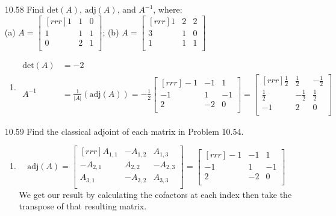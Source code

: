 \documentclass[12pt]{article}
\theoremstyle{definition}
\theoremstyle{plain}
\begin{document}
\begin{enumerate}
\item[10.58]Find $\mathrm{det}(A)$, $\mathrm{adj}(A)$, and $A^{-1}$, where:\\
(a) $A=\begin{bmatrix}[rrr]1&1&0\\1&1&1\\0&2&1\\\end{bmatrix}$; (b) $A=\begin{bmatrix}[rrr]1&2&2\\3&1&0\\1&1&1\\\end{bmatrix}$
	\begin{enumerate}
	\item
	\begin{align*}
	\mathrm{det}(A)&= -2\\
	A^{-1}&=\frac{1}{|A|}(\mathrm{adj}(A))=-\frac{1}{2}\begin{bmatrix}[rrr]-1&-1&1\\-1&1&-1\\2&-2&0\\\end{bmatrix} = \begin{bmatrix}[rrr]\frac{1}{2}&\frac{1}{2}&-\frac{1}{2}\\\frac{1}{2}&-\frac{1}{2}&\frac{1}{2}\\-1&2&0\\\end{bmatrix}
	\end{align*}
	\end{enumerate}		
	
\item[10.59]Find the classical adjoint of each matrix in Problem 10.54.
	\begin{enumerate}
	\item
	\[ \mathrm{adj}(A)= \begin{bmatrix}[rrr]A_{1,1}&-A_{1,2}&A_{1,3}\\-A_{2,1}&A_{2,2}&-A_{2,3}\\A_{3,1}&-A_{3,2}&A_{3,3}\\\end{bmatrix} = \begin{bmatrix}[rrr]-1&-1&1\\-1&1&-1\\2&-2&0\\\end{bmatrix} \]
	We get our result by calculating the cofactors at each index then take the transpose of that resulting matrix.
	\end{enumerate}		


\end{enumerate}
\end{document}
